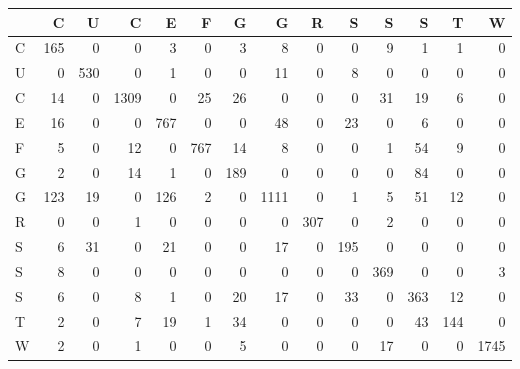 \begin{tabular}{lrrrrrrrrrrrrr}
\toprule
{} &    C &    U &     C &    E &    F &    G &     G &    R &    S &    S &    S &    T &     W \\
\midrule
C &  165 &    0 &     0 &    3 &    0 &    3 &     8 &    0 &    0 &    9 &    1 &    1 &     0 \\
U &    0 &  530 &     0 &    1 &    0 &    0 &    11 &    0 &    8 &    0 &    0 &    0 &     0 \\
C &   14 &    0 &  1309 &    0 &   25 &   26 &     0 &    0 &    0 &   31 &   19 &    6 &     0 \\
E &   16 &    0 &     0 &  767 &    0 &    0 &    48 &    0 &   23 &    0 &    6 &    0 &     0 \\
F &    5 &    0 &    12 &    0 &  767 &   14 &     8 &    0 &    0 &    1 &   54 &    9 &     0 \\
G &    2 &    0 &    14 &    1 &    0 &  189 &     0 &    0 &    0 &    0 &   84 &    0 &     0 \\
G &  123 &   19 &     0 &  126 &    2 &    0 &  1111 &    0 &    1 &    5 &   51 &   12 &     0 \\
R &    0 &    0 &     1 &    0 &    0 &    0 &     0 &  307 &    0 &    2 &    0 &    0 &     0 \\
S &    6 &   31 &     0 &   21 &    0 &    0 &    17 &    0 &  195 &    0 &    0 &    0 &     0 \\
S &    8 &    0 &     0 &    0 &    0 &    0 &     0 &    0 &    0 &  369 &    0 &    0 &     3 \\
S &    6 &    0 &     8 &    1 &    0 &   20 &    17 &    0 &   33 &    0 &  363 &   12 &     0 \\
T &    2 &    0 &     7 &   19 &    1 &   34 &     0 &    0 &    0 &    0 &   43 &  144 &     0 \\
W &    2 &    0 &     1 &    0 &    0 &    5 &     0 &    0 &    0 &   17 &    0 &    0 &  1745 \\
\bottomrule
\end{tabular}
